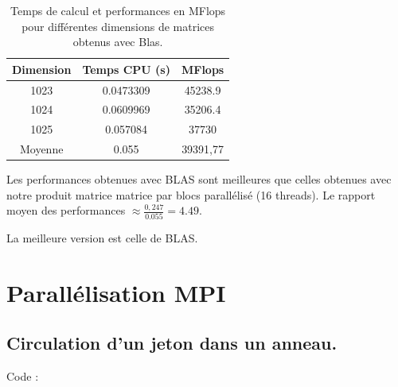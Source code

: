 \documentclass[a4paper,13pt]{book}
\begin{document}
 \begin{table}[h!]
    \begin{center}
    \begin{tabular}{|c|c|c|}
        \hline
        Dimension & Temps CPU (s) & MFlops \\ \hline
        1023      & 0.0473309       & 45238.9 \\ \hline
        1024      & 0.0609969       & 35206.4 \\ \hline
        1025      & 0.057084       & 37730 \\ \hline
        Moyenne & 0.055 & 39391,77 \\ \hline
    \end{tabular}
    \caption{Temps de calcul et performances en MFlops pour différentes dimensions de matrices obtenus avec Blas.}
    \label{tab:perf_matrix}
\end{center}
\end{table}
Les performances obtenues avec BLAS sont meilleures que celles obtenues avec notre produit matrice matrice par blocs parallélisé (16 threads). Le rapport moyen des performances $\approx \frac{0,247}{0.055} = 4.49$.

La meilleure version est celle de BLAS.
\section{Parallélisation MPI}
\subsection{Circulation d'un jeton dans un anneau.}


Code : \\
\end{document}
